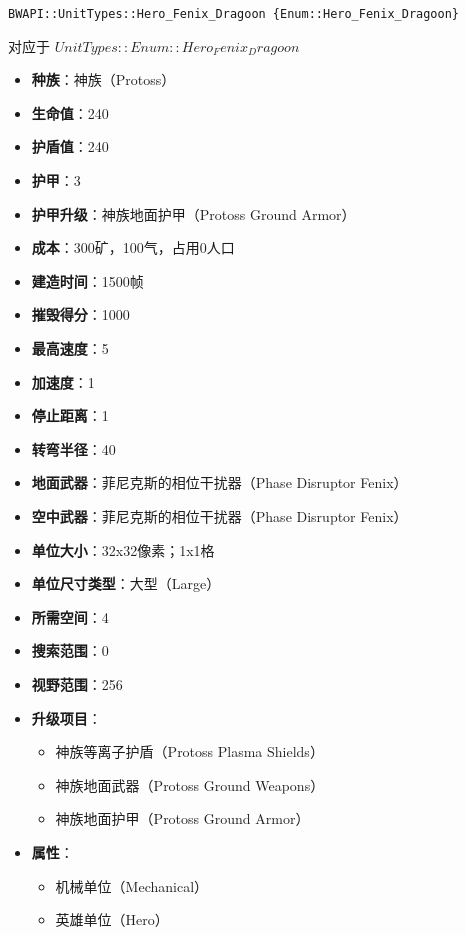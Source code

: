 \begin{tcolorbox}[colback=white, colframe=black!60!white, title=Hero\_Fenix\_Dragoon(), arc=0mm]
    \begin{verbatim}
BWAPI::UnitTypes::Hero_Fenix_Dragoon {Enum::Hero_Fenix_Dragoon}
    \end{verbatim}
    对应于  $ UnitTypes::Enum::Hero_Fenix_Dragoon $ 
    \begin{itemize}
        \item \textbf{种族}：神族（Protoss）
        \item \textbf{生命值}：240
        \item \textbf{护盾值}：240
        \item \textbf{护甲}：3
        \item \textbf{护甲升级}：神族地面护甲（Protoss Ground Armor）
        \item \textbf{成本}：300矿，100气，占用0人口
        \item \textbf{建造时间}：1500帧
        \item \textbf{摧毁得分}：1000
        \item \textbf{最高速度}：5
        \item \textbf{加速度}：1
        \item \textbf{停止距离}：1
        \item \textbf{转弯半径}：40
        \item \textbf{地面武器}：菲尼克斯的相位干扰器（Phase Disruptor Fenix）
        \item \textbf{空中武器}：菲尼克斯的相位干扰器（Phase Disruptor Fenix）
        \item \textbf{单位大小}：32x32像素；1x1格
        \item \textbf{单位尺寸类型}：大型（Large）
        \item \textbf{所需空间}：4
        \item \textbf{搜索范围}：0
        \item \textbf{视野范围}：256
        \item \textbf{升级项目}：
            \begin{itemize}
                \item 神族等离子护盾（Protoss Plasma Shields）
                \item 神族地面武器（Protoss Ground Weapons）
                \item 神族地面护甲（Protoss Ground Armor）
            \end{itemize}
        \item \textbf{属性}：
            \begin{itemize}
                \item 机械单位（Mechanical）
                \item 英雄单位（Hero）
            \end{itemize}
    \end{itemize}
\end{tcolorbox}


